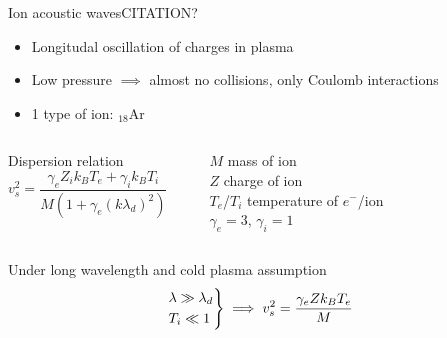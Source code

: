 \documentclass[10pt]{beamer}
\newcommand{\electron}[0]{$e^{-}$}
\begin{document}
\begin{frame}{Ion acoustic waves}{CITATION?}
    \begin{itemize}
        \item Longitudal oscillation of charges in plasma
        \item Low pressure $\implies$ almost no collisions, only Coulomb interactions
        \item 1 type of ion: $_{18}$Ar
    \end{itemize}
    
    \vspace{0.5cm}
    \begin{columns}[T]
        Dispersion relation
        \begin{equation*}
            v_s^2 = \frac{\gamma_e Z_i k_B T_e + \gamma_i k_B T_i}{M(1+\gamma_e(k\lambda_d)^2)}
        \end{equation*}
        
        \rule{.1mm}{1.5cm}

        \vfill
        \centering
        $M$ mass of ion \\
        $Z$ charge of ion \\
        $T_e$/$T_i$ temperature of \electron/ion \\
        $\gamma_e=3$, $\gamma_i=1$
        \vfill
    \end{columns}

    \vspace{0.8cm}
    Under long wavelength and cold plasma assumption
    \begin{equation*}
        \begin{rcases}
            \lambda \gg \lambda_d \\
            T_i \ll 1
        \end{rcases}
        \implies v_s^2 = \frac{\gamma_e Z k_B T_e}{M}
    \end{equation*}
\end{frame}
\end{document}
